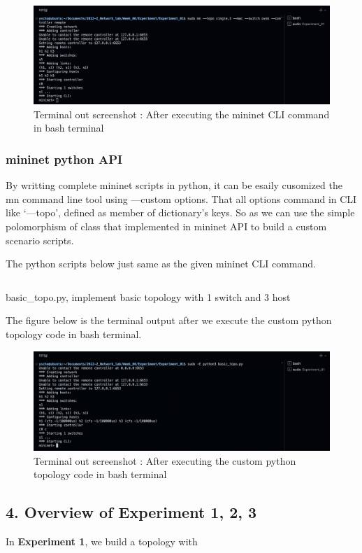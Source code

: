 \vspace{-4mm}
\begin{figure}[!h]\centering 
	\includegraphics[width=.9\textwidth]{image/week06/1-3-1.png}
	\caption{\footnotesize 
	Terminal out screenshot : After executing the mininet CLI command in bash terminal}
	\vspace{-10pt}
\end{figure}
\vspace{-4mm}
\subsubsection*{mininet python API}
By writting complete mininet scripts in python, it can be esaily cusomized the mn command line tool using —custom options. That all options command in CLI like ‘—topo’, defined as member of dictionary’s keys. 
So as we can use the simple polomorphism of class that implemented in mininet API to build a custom scenario scripts.

The python scripts below just same as the given mininet CLI command.
\begin{listing}[h!]
\inputminted[framerule = 1pt,framesep = 2mm , frame = lines, fontsize=\scriptsize]{python}{./code/week06/basic_topo.py}
\caption{\footnotesize basic\_topo.py, implement basic topology with 1 switch and 3 host }
\end{listing}
\clearpage
The figure below is the terminal output after we execute the custom python topology code in bash terminal.\\
\vspace{-4mm}
\begin{figure}[!h]\centering 
	\includegraphics[width=.9\textwidth]{image/week06/1-3-2.png}
	\caption{\footnotesize 
	Terminal out screenshot : After executing the custom python topology code in bash terminal}
	\vspace{-10pt}
\end{figure}
\subsection*{4. Overview of Experiment 1, 2, 3}
In \textbf{Experiment 1}, we build a topology with 
\clearpage
